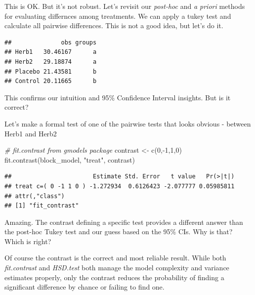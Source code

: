 \documentclass[
]{book}
\newenvironment{Shaded}{\begin{snugshade}}{\end{snugshade}}
\newcommand{\AttributeTok}[1]{\textcolor[rgb]{0.77,0.63,0.00}{#1}}
\newcommand{\CommentTok}[1]{\textcolor[rgb]{0.56,0.35,0.01}{\textit{#1}}}
\newcommand{\ConstantTok}[1]{\textcolor[rgb]{0.00,0.00,0.00}{#1}}
\newcommand{\DecValTok}[1]{\textcolor[rgb]{0.00,0.00,0.81}{#1}}
\newcommand{\FunctionTok}[1]{\textcolor[rgb]{0.00,0.00,0.00}{#1}}
\newcommand{\NormalTok}[1]{#1}
\newcommand{\OtherTok}[1]{\textcolor[rgb]{0.56,0.35,0.01}{#1}}
\newcommand{\SpecialCharTok}[1]{\textcolor[rgb]{0.00,0.00,0.00}{#1}}
\newcommand{\StringTok}[1]{\textcolor[rgb]{0.31,0.60,0.02}{#1}}
\begin{document}
This is OK. But it's not robust. Let's revisit our \emph{post-hoc} and \emph{a priori} methods for evaluating differnces among treatments. We can apply a tukey test and calculate all pairwise differences. This is not a good idea, but let's do it.

\begin{Shaded}
\end{Shaded}

\begin{verbatim}
##              obs groups
## Herb1   30.46167      a
## Herb2   29.18874      a
## Placebo 21.43581      b
## Control 20.11665      b
\end{verbatim}

This confirms our intuition and 95\% Confidence Interval insights. But is it correct?

Let's make a formal test of one of the pairwise tests that looks obvious - between Herb1 and Herb2

\begin{Shaded}
\begin{Highlighting}[]
\CommentTok{\# fit.contrast from gmodels package}
\NormalTok{contrast }\OtherTok{\textless{}{-}} \FunctionTok{c}\NormalTok{(}\DecValTok{0}\NormalTok{,}\SpecialCharTok{{-}}\DecValTok{1}\NormalTok{,}\DecValTok{1}\NormalTok{,}\DecValTok{0}\NormalTok{)}
\FunctionTok{fit.contrast}\NormalTok{(block\_model, }\StringTok{"treat"}\NormalTok{, contrast)}
\end{Highlighting}
\end{Shaded}

\begin{verbatim}
##                       Estimate Std. Error   t value   Pr(>|t|)
## treat c=( 0 -1 1 0 ) -1.272934  0.6126423 -2.077777 0.05985811
## attr(,"class")
## [1] "fit_contrast"
\end{verbatim}

Amazing. The contrast defining a specific test provides a different answer than the post-hoc Tukey test and our guess based on the 95\% CIs. Why is that? Which is right?

Of course the contrast is the correct and most reliable result. While both \emph{fit.contrast} and \emph{HSD.test} both manage the model complexity and variance estimates properly, only the contrast reduces the probability of finding a significant difference by chance or failing to find one.
\end{document}
